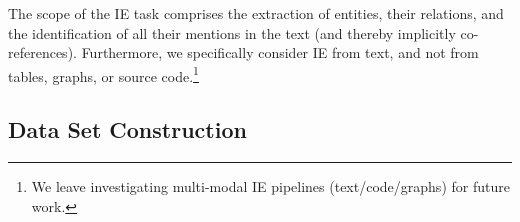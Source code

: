 




The scope of the IE task comprises the extraction of entities, their relations, and the identification of all their mentions in the text (and thereby implicitly co-references). %
Furthermore, we specifically consider IE from text, and not from tables, graphs, or source code.\footnote{We leave investigating multi-modal IE pipelines (text/code/graphs) for future work.}

\subsection{Data Set Construction}\label{sec:data-set-contruction}





